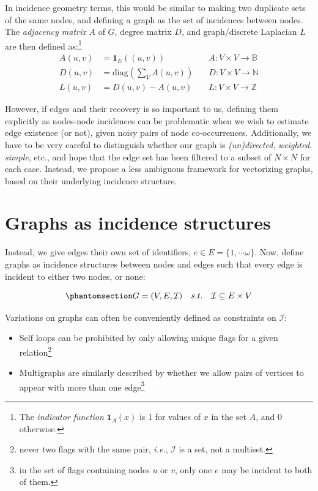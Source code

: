 \documentclass[%
	12pt,
		oneside,
		letterpaper
]{book}
\providecommand{\tightlist}{%
  \setlength{\itemsep}{0pt}\setlength{\parskip}{0pt}}
\begin{document}
In incidence geometry terms, this would be similar to making two
duplicate sets of the same nodes, and defining a graph as the set of
incidences between nodes. The \emph{adjacency matrix} \(A\) of \(G\),
degree matrix \(D\), and graph/discrete Laplacian \(L\) are then defined
as:\footnote{ The \emph{indicator function} \(\mathbf{1}_A(x)\) is 1 for
  values of \(x\) in the set \(A\), and 0 otherwise.} \[
\begin{aligned}
A(u,v) & =\mathbf{1}_E((u,v)) \quad &A : V\times V\rightarrow \mathbb{B} \\
D(u,v) & =\mathrm{diag}({\textstyle\sum}_V A(u,v))\quad &D : V\times V\rightarrow \mathbb{N} \\
L(u,v) & = D(u,v) - A(u,v) \quad &L : V\times V\rightarrow \mathbb{Z} 
\end{aligned}
\]

However, if edges and their recovery is so important to us, defining
them explicitly as nodes-node incidences can be problematic when we wish
to estimate edge existence (or not), given noisy pairs of node
co-occurrences. Additionally, we have to be very careful to distinguish
whether our graph is \emph{(un)directed}, \emph{weighted},
\emph{simple}, etc., and hope that the edge set has been filtered to a
subset of \(N\times N\) for each case. Instead, we propose a less
ambiguous framework for vectorizing graphs, based on their underlying
incidence structure.

\section{Graphs as incidence structures}\label{sec-incidence-vec}

Instead, we give edges their own set of identifiers,
\(e\in E=\{1,\cdots \omega\}\). Now, define graphs as incidence
structures between nodes and edges such that every edge is incident to
either two nodes, or none:

\begin{equation}\phantomsection\label{eq-simple-incidence}{
G = (V,E,\mathcal{I}) \quad s.t. \quad \mathcal{I} \subseteq E\times V
}\end{equation}

Variations on graphs can often be conveniently defined as constraints on
\(\mathcal{I}\):

\begin{itemize}
\tightlist
\item
  Self loops can be prohibited by only allowing unique flags for a given
  relation\footnote{ never two flags with the same pair, \emph{i.e.},
    \(\mathcal{I}\) is a set, not a multiset.}
\item
  Multigraphs are similarly described by whether we allow pairs of
  vertices to appear with more than one edge\footnote{ in the set of
    flags containing nodes \(u\) or \(v\), only one \(e\) may be
    incident to both of them.}
\end{itemize}
\end{document}
